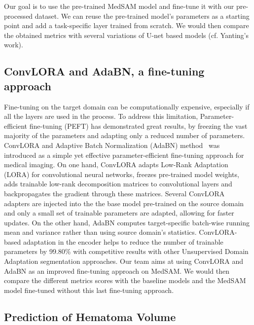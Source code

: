\documentclass[11pt, journal, a4paper]{IEEEtran}
\begin{document}
Our goal is to use the pre-trained MedSAM model and fine-tune it with our pre-processed dataset. We can reuse the pre-trained model's parameters as a starting point and add a task-specific layer trained from scratch. We would then compare the obtained metrics with several variations of U-net based models (cf. Yanting's work).

\subsection{ConvLORA and AdaBN, a fine-tuning approach}
Fine-tuning on the target domain can be computationally expensive, especially if all the layers are used in the process. To address this limitation, Parameter-efficient fine-tuning (PEFT) has demonstrated great results, by freezing the vast majority of the parameters and adapting only a reduced number of parameters. ConvLORA and Adaptive Batch Normalization (AdaBN) method~\cite{aleem2024convlora} was introduced as a simple yet effective parameter-efficient fine-tuning approach for medical imaging. On one hand, ConvLORA adapts Low-Rank Adaptation (LORA) for convolutional neural networks, freezes pre-trained model weights, adds trainable low-rank decomposition matrices to convolutional layers and backpropagates the gradient through these matrices. Several ConvLORA adapters are injected into the the base model pre-trained on the source domain and only a small set of trainable parameters are adapted, allowing for faster updates. On the other hand, AdaBN computes target-specific batch-wise running mean and variance rather than using source domain's statistics. ConvLORA-based adaptation in the encoder helps to reduce the number of trainable parameters by 99.80\% with competitive results with other Unsupervised Domain Adaptation segmentation approaches.
Our team aims at using ConvLORA and AdaBN as an improved fine-tuning approach on MedSAM. We would then compare the different metrics scores with the baseline models and the MedSAM model fine-tuned without this last fine-tuning approach.

\subsection{Prediction of Hematoma Volume}
\end{document}

